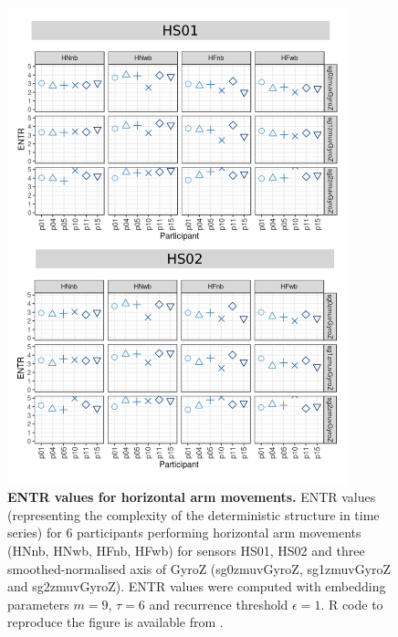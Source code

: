 \begin{figure}[!h]
\centering
\includegraphics[width=0.88\textwidth]{rqa_entr_H_w500}
    \caption{
	{\bf ENTR values for horizontal arm movements.}
	ENTR values (representing the complexity of the deterministic 
	structure in time series) for 
	6 participants performing horizontal arm movements 
	(HNnb, HNwb, HFnb, HFwb)
	for sensors HS01, HS02 and three smoothed-normalised axis 
	of GyroZ (sg0zmuvGyroZ, sg1zmuvGyroZ and sg2zmuvGyroZ).
	ENTR values were computed with 
	embedding parameters $m=9$, $\tau=6$ and recurrence threshold
	$\epsilon=1$.
	R code to reproduce the figure is available from \cite{hwum2018}.
        }
    \label{fig:rqa_entr_H}
\end{figure}
